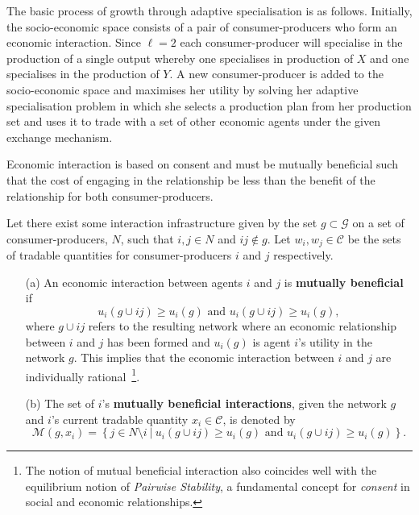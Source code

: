 The basic process of growth through adaptive specialisation is as follows. Initially, the socio-economic space consists of a pair of consumer-producers who form an economic interaction. Since $\ell = 2$ each consumer-producer will specialise in the production of a single output whereby one specialises in production of $X$ and one specialises in the production of $Y$. A new consumer-producer is added to the socio-economic space and maximises her utility by solving her adaptive specialisation problem in which she selects a production plan from her production set and uses it to trade with a set of other economic agents under the given exchange mechanism.

Economic interaction is based on consent and must be mutually beneficial such that the cost of engaging in the relationship be less than the benefit of the relationship for both consumer-producers.

\begin{definition}
Let there exist some interaction infrastructure given by the set $g \subset \mathcal{G}$ on a set of consumer-producers, $N$, such that $i,j \in N$ and $ij \notin g$. Let $w_{i}, w_{j} \in \mathcal{C}$ be the sets of tradable quantities for consumer-producers $i$ and $j$ respectively.
\begin{itemize}
\item[(a)] An economic interaction between agents $i$ and $j$ is \textbf{mutually beneficial} if
\begin{equation}
u_{i}(g \cup ij) \geqslant u_{i}(g) \mbox{ and } u_{i}(g \cup ij) \geqslant u_{i}(g) ,
\end{equation}
where $g \cup ij$ refers to the resulting network where an economic relationship between $i$ and $j$ has been formed and $u_{i}(g)$ is agent $i$'s utility in the network $g$. This implies that the economic interaction between $i$ and $j$ are individually rational~\footnote{The notion of mutual beneficial interaction also coincides well with the equilibrium notion of \emph{Pairwise Stability}, a fundamental concept for \emph{consent} in social and economic relationships.}.

\item[(b)] The set of $i$'s \textbf{mutually beneficial interactions}, given the network $g$ and $i$'s current tradable quantity $x_{i} \in \mathcal{C}$, is denoted by
\begin{equation}
\mathcal{M}(g,x_{i}) = \left\{ j \in N \setminus i ~ | ~ u_{i}(g \cup ij) \geqslant u_{i}(g) \mbox{ and } u_{i}(g \cup ij) \geqslant u_{i}(g) \right\}.
\end{equation}
\end{itemize}
\end{definition}

